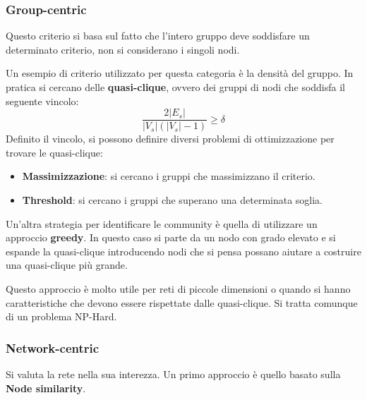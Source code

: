 \subsubsection{Group-centric}
Questo criterio si basa sul fatto che l'intero gruppo deve soddisfare un determinato
criterio, non si considerano i singoli nodi.

Un esempio di criterio utilizzato per questa categoria è la densità del gruppo.
In pratica si cercano delle \textbf{quasi-clique}, ovvero dei gruppi di nodi
che soddisfa il seguente vincolo:
\begin{equation}
    \frac{2 |E_s|}{|V_s|(|V_s| - 1)} \geq \delta
\end{equation}
Definito il vincolo, si possono definire diversi problemi di ottimizzazione per
trovare le quasi-clique:
\begin{itemize}
    \item \textbf{Massimizzazione}: si cercano i gruppi che massimizzano il criterio.
    \item \textbf{Threshold}: si cercano i gruppi che superano una determinata soglia.
\end{itemize}
Un'altra strategia per identificare le community è quella di utilizzare un approccio
\textbf{greedy}. In questo caso si parte da un nodo con grado elevato e si espande
la quasi-clique introducendo nodi che si pensa possano aiutare a costruire una
quasi-clique più grande.

Questo approccio è molto utile per reti di piccole dimensioni o quando si hanno
caratteristiche che devono essere rispettate dalle quasi-clique. Si tratta comunque
di un problema NP-Hard.
\subsubsection{Network-centric}
Si valuta la rete nella sua interezza. Un primo approccio è quello basato sulla
\textbf{Node similarity}.
